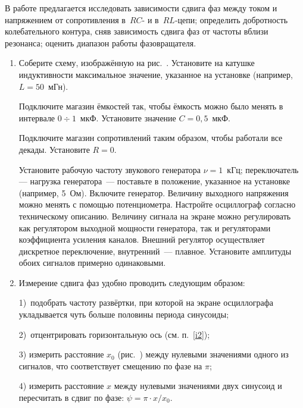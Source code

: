 \begin{lab:task}

	В работе предлагается исследовать зависимости сдвига фаз между током и
напряжением от сопротивления в~$RC$- и
	в~$RL$-цепи; определить добротность колебательного контура, сняв зависимость
сдвига фаз от частоты вблизи резонанса;
	оценить диапазон работы фазовращателя.

	\begin{enumerate}


	\item Соберите схему, изображённую на рис.~. Установите на
катушке индуктивности максимальное значение, указанное на установке (например,
~$L=50$~мГн).

	Подключите магазин ёмкостей так, чтобы ёмкость можно было менять в интервале
$0\div1$~мкФ. Установите значение $C=0,5$~мкФ.

	Подключите магазин сопротивлений таким образом, чтобы работали все декады.
Установите $R=0$.

	Установите рабочую частоту звукового генератора $\nu=1$~кГц;
переключатель--- нагрузка
	генератора~--- поставьте в положение, указанное на установке (например,
5~Ом). Включите генератор. Величину выходного напряжения можно менять с помощью
потенциометра.
	Настройте осциллограф согласно техническому описанию.
	Величину сигнала на экране можно регулировать как регулятором выходной
мощности генератора, так и регуляторами
	коэффициента усиления каналов. Внешний регулятор осуществляет дискретное
переключение, внутренний~--- плавное.
	Установите амплитуды обоих сигналов примерно одинаковыми.

	\item \label{i2} Измерение сдвига фаз удобно проводить следующим образом:

	1)~подобрать частоту развёртки, при которой на экране осциллографа
укладывается чуть больше половины периода синусоиды;

	2)~отцентрировать горизонтальную ось (см. п.~\ref{i2});

	3) измерить расстояние $x_0$ (рис.~) между нулевыми значениями
одного из сигналов, что соответствует смещению по
	фазе на $\pi$;

	4) измерить расстояние $x$ между нулевыми значениями двух синусоид и
пересчитать в сдвиг по фазе: $\psi=\pi\cdot x/x_0$.



\end{enumerate}
\end{lab:task}
